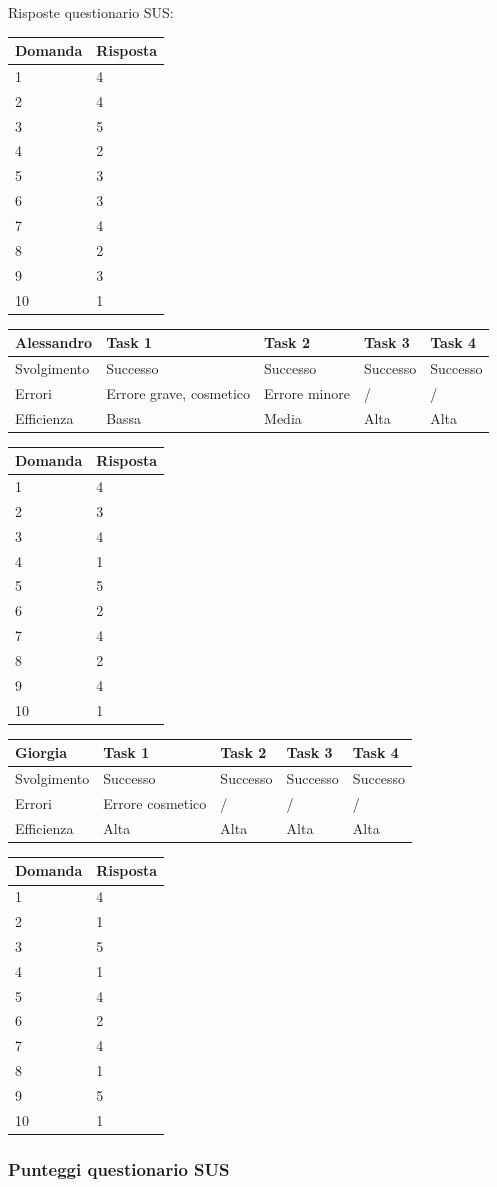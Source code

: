 \documentclass[12pt,italian,]{report}
\begin{document}
Risposte questionario SUS:

\begin{longtable}[]{@{}ll@{}}
\toprule
Domanda & Risposta\tabularnewline
\midrule
\endhead
1 & 4\tabularnewline
2 & 4\tabularnewline
3 & 5\tabularnewline
4 & 2\tabularnewline
5 & 3\tabularnewline
6 & 3\tabularnewline
7 & 4\tabularnewline
8 & 2\tabularnewline
9 & 3\tabularnewline
10 & 1\tabularnewline
\bottomrule
\end{longtable}

\begin{longtable}[]{@{}lllll@{}}
\toprule
Alessandro & Task 1 & Task 2 & Task 3 & Task 4\tabularnewline
\midrule
\endhead
Svolgimento & Successo & Successo & Successo & Successo\tabularnewline
Errori & Errore grave, cosmetico & Errore minore & / & /\tabularnewline
Efficienza & Bassa & Media & Alta & Alta\tabularnewline
\bottomrule
\end{longtable}

\begin{longtable}[]{@{}ll@{}}
\toprule
Domanda & Risposta\tabularnewline
\midrule
\endhead
1 & 4\tabularnewline
2 & 3\tabularnewline
3 & 4\tabularnewline
4 & 1\tabularnewline
5 & 5\tabularnewline
6 & 2\tabularnewline
7 & 4\tabularnewline
8 & 2\tabularnewline
9 & 4\tabularnewline
10 & 1\tabularnewline
\bottomrule
\end{longtable}

\begin{longtable}[]{@{}lllll@{}}
\toprule
Giorgia & Task 1 & Task 2 & Task 3 & Task 4\tabularnewline
\midrule
\endhead
Svolgimento & Successo & Successo & Successo & Successo\tabularnewline
Errori & Errore cosmetico & / & / & /\tabularnewline
Efficienza & Alta & Alta & Alta & Alta\tabularnewline
\bottomrule
\end{longtable}

\begin{longtable}[]{@{}ll@{}}
\toprule
Domanda & Risposta\tabularnewline
\midrule
\endhead
1 & 4\tabularnewline
2 & 1\tabularnewline
3 & 5\tabularnewline
4 & 1\tabularnewline
5 & 4\tabularnewline
6 & 2\tabularnewline
7 & 4\tabularnewline
8 & 1\tabularnewline
9 & 5\tabularnewline
10 & 1\tabularnewline
\bottomrule
\end{longtable}

\hypertarget{punteggi-questionario-sus}{%
\subsubsection{Punteggi questionario
SUS}\label{punteggi-questionario-sus}}
\end{document}
